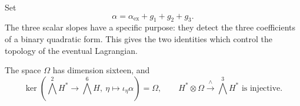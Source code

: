 Set
\begin{equation}
 \alpha=\alpha_{\mathrm{ex}}+g_1+g_2+g_3.
 \label{hodge:alpha}
\end{equation}
The three scalar slopes have a specific purpose: they detect the three
coefficients of a binary quadratic form.  This gives the two identities
which control the topology of the eventual Lagrangian.

\begin{lemma}
\label{hodge:linear-algebra}
The space $\Omega$ has dimension sixteen, and
\begin{equation}
 \ker\left(\bigwedge^2H^*\longrightarrow\bigwedge^6H,
                \ \eta\longmapsto\iota_\eta\alpha\right)=\Omega,
 \qquad
 H^*\otimes\Omega\xrightarrow{\ \wedge\ }\bigwedge^3H^*
 \text{ is injective}.
 \label{hodge:linear-identities}
\end{equation}
\end{lemma}

